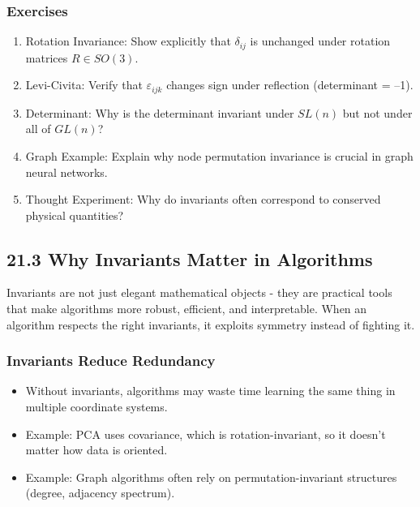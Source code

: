 \documentclass[
  letterpaper,
  DIV=11,
  numbers=noendperiod]{scrreprt}
\providecommand{\tightlist}{%
  \setlength{\itemsep}{0pt}\setlength{\parskip}{0pt}}
\begin{document}
\subsubsection{Exercises}\label{exercises-73}

\begin{enumerate}
\def\labelenumi{\arabic{enumi}.}
\item
  Rotation Invariance: Show explicitly that \(\delta_{ij}\) is unchanged
  under rotation matrices \(R \in SO(3)\).
\item
  Levi-Civita: Verify that \(\varepsilon_{ijk}\) changes sign under
  reflection (determinant = --1).
\item
  Determinant: Why is the determinant invariant under \(SL(n)\) but not
  under all of \(GL(n)\)?
\item
  Graph Example: Explain why node permutation invariance is crucial in
  graph neural networks.
\item
  Thought Experiment: Why do invariants often correspond to conserved
  physical quantities?
\end{enumerate}

\subsection{21.3 Why Invariants Matter in
Algorithms}\label{why-invariants-matter-in-algorithms}

Invariants are not just elegant mathematical objects - they are
practical tools that make algorithms more robust, efficient, and
interpretable. When an algorithm respects the right invariants, it
exploits symmetry instead of fighting it.

\subsubsection{Invariants Reduce
Redundancy}\label{invariants-reduce-redundancy}

\begin{itemize}
\tightlist
\item
  Without invariants, algorithms may waste time learning the same thing
  in multiple coordinate systems.
\item
  Example: PCA uses covariance, which is rotation-invariant, so it
  doesn't matter how data is oriented.
\item
  Example: Graph algorithms often rely on permutation-invariant
  structures (degree, adjacency spectrum).
\end{itemize}
\end{document}
